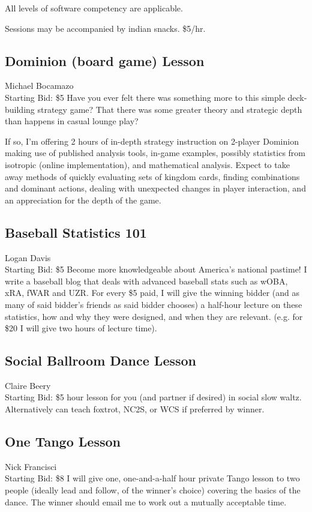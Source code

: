 \documentclass[11pt]{article}
\begin{document}
All levels of software competency are applicable. 

Sessions may be accompanied by indian snacks. \$5/hr.
\subsection{Dominion (board game) Lesson}
Michael Bocamazo
\\
Starting Bid: \$5
\newline
Have you ever felt there was something more to this simple deck-building strategy game?  That there was some greater theory and strategic depth than happens in casual lounge play?  

If so, I'm offering 2 hours of in-depth strategy instruction on 2-player Dominion making use of published analysis tools, in-game examples, possibly statistics from isotropic (online implementation), and mathematical analysis.  Expect to take away methods of quickly evaluating sets of kingdom cards, finding combinations and dominant actions, dealing with unexpected changes in player interaction, and an appreciation for the depth of the game.
\subsection{Baseball Statistics 101}
Logan Davis
\\
Starting Bid: \$5
\newline
Become more knowledgeable about America's national pastime! I write a baseball blog that deals with advanced baseball stats such as wOBA, xRA, fWAR and UZR. For every \$5 paid, I will give the winning bidder (and as many of said bidder's friends as said bidder chooses) a half-hour lecture on these statistics, how and why they were designed, and when they are relevant. (e.g. for \$20 I will give two hours of lecture time).
\subsection{Social Ballroom Dance Lesson}
Claire Beery
\\
Starting Bid: \$5
 hour lesson for you (and partner if desired) in social slow waltz. Alternatively can teach foxtrot, NC2S, or WCS if preferred by winner.
\subsection{One Tango Lesson}
Nick Francisci
\\
Starting Bid: \$8
\newline
I will give one, one-and-a-half hour private Tango lesson to two people (ideally lead and follow, of the winner's choice) covering the basics of the dance. The winner should email me to work out a mutually acceptable time.
\end{document}
